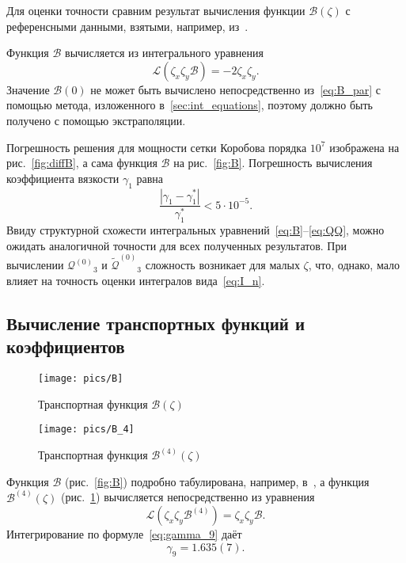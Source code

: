 \documentclass[a4paper,12pt]{article}
\newcommand{\Q}{\ensuremath{\mathcal{Q}^{(0)}}}
\newcommand{\B}{\ensuremath{\mathcal{B}^{(4)}}}
\newcommand{\QQ}{\ensuremath{\tilde{\mathcal{Q}}^{(0)}}}
\begin{document}
Для оценки точности сравним результат вычисления функции \(\mathcal{B}(\zeta)\)
с референсными данными, взятыми, например, из~\cite{Sone2002}.

Функция \(\mathcal{B}\) вычисляется из интегрального уравнения
\begin{equation}\label{eq:B_par}
    \mathcal{L}(\zeta_x\zeta_y\mathcal{B}) = -2\zeta_x\zeta_y.
\end{equation}
Значение \(\mathcal{B}(0)\) не может быть вычислено непосредственно из~\eqref{eq:B_par}
с помощью метода, изложенного в~\ref{sec:int_equations},
поэтому должно быть получено с помощью экстраполяции.

Погрешность решения для мощности сетки Коробова порядка \(10^7\) изображена на рис.~\ref{fig:diffB},
а сама функция \(\mathcal{B}\) на рис.~\ref{fig:B}.
Погрешность вычисления коэффициента вязкости \(\gamma_1\) равна
\begin{equation}\label{eq:gamma_error}
    \frac{|\gamma_1-\gamma_1^*|}{\gamma_1^*} < 5\cdot10^{-5}.
\end{equation}
Ввиду структурной схожести интегральных уравнений~\eqref{eq:B}--\eqref{eq:QQ},
можно ожидать аналогичной точности для всех полученных результатов.
При вычислении \(\Q_3\) и \(\QQ_3\) сложность возникает для малых \(\zeta\),
что, однако, мало влияет на точность оценки интегралов вида~\eqref{eq:I_n}.


\subsection{Вычисление транспортных функций и коэффициентов}

\begin{figure}
    \centering
    \begin{minipage}[b]{0.5\textwidth}
        \centering
        \texttt{[image: pics/B]}
        \caption{Транспортная функция \(\mathcal{B}(\zeta)\)}
        \label{fig:B}
    \end{minipage}%
    \begin{minipage}[b]{0.5\textwidth}
        \centering
        \texttt{[image: pics/B\_4]}
        \caption{Транспортная функция \(\B(\zeta)\)}
        \label{fig:B_4}
    \end{minipage}
\end{figure}

Функция \(\mathcal{B}\) (рис.~\ref{fig:B}) подробно табулирована, например, в~\cite{Sone2002},
а функция \(\B(\zeta)\) (рис.~\ref{fig:B_4}) вычисляется непосредственно из уравнения
\begin{equation}\label{eq:B_4_par}
    \mathcal{L}(\zeta_x\zeta_y\B) = \zeta_x\zeta_y\mathcal{B}.
\end{equation}
Интегрирование по формуле~\eqref{eq:gamma_9} даёт
\begin{equation}\label{eq:gamma_9_result}
    \gamma_9 = 1.635(7).
\end{equation}
\end{document}
